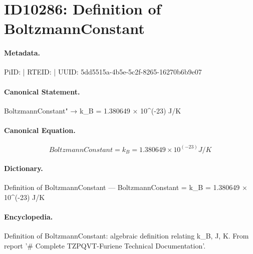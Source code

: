 \section*{ID10286: Definition of BoltzmannConstant}
\paragraph{Metadata.}
PiID:  | RTEID:  | UUID: 5dd5515a-4b5e-5c2f-8265-16270b6b9e07

\paragraph{Canonical Statement.}
BoltzmannConstant" → k\_B = 1.380649 × 10\textasciicircum{}(-23) J/K

\paragraph{Canonical Equation.}
\[
BoltzmannConstant = k_B = 1.380649 × 10^(-23) J/K
\]

\paragraph{Dictionary.}
Definition of BoltzmannConstant — BoltzmannConstant = k\_B = 1.380649 × 10\textasciicircum{}(-23) J/K

\paragraph{Encyclopedia.}
Definition of BoltzmannConstant: algebraic definition relating k\_B, J, K. From report '\# Complete TZPQVT-Furiene Technical Documentation'.
